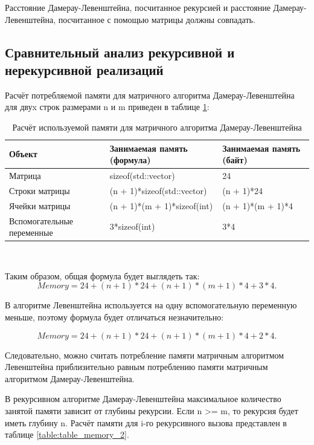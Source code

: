 \documentclass[a4paper,12pt]{article}
\begin{document}
    Расстояние Дамерау-Левенштейна, посчитанное рекурсией и расстояние Дамерау-Левенштейна, посчитанное с помощью матрицы должны совпадать.

	\subsection{Сравнительный анализ рекурсивной и нерекурсивной реализаций}
	
	Расчёт потребляемой памяти для матричного алгоритма Дамерау-Левенштейна для двуx строк размерами n и m приведен в таблице \ref{table:table_memory_1}:
	\begin{table} [h!]
	\begin{center}
	\caption{Расчёт используемой памяти для матричного алгоритма Дамерау-Левенштейна}
	\begin{tabular}{|p{4cm}|p{6cm}|p{5cm}|}
	\hline 
	Объект & Занимаемая память (формула)  & Занимаемая память (байт) \\ 
	\hline 
	Матрица & sizeof(std::vector) & 24 \\ 
	\hline 
	Строки матрицы & (n + 1)*sizeof(std::vector) & (n + 1)*24 \\ 
	\hline 
	Ячейки матрицы & (n + 1)*(m + 1)*sizeof(int) & (n + 1)*(m + 1)*4 \\ 
	\hline 
	Вспомогательные переменные  & 3*sizeof(int) & 3*4 \\ 
	\hline 
	\end{tabular} \\
    \label{table:table_memory_1}
    \end{center}
	\end{table}
	
	
	Таким образом, общая формула будет выглядеть так:
	\begin{equation}
	Memory = 24 + (n + 1)*24 + (n + 1)*(m + 1)*4 + 3*4.
	\label{eq:mem_1}
	\end{equation}
	
	
	В алгоритме Левенштейна используется на одну вспомогательную переменную меньше, поэтому формула будет отличаться незначительно:
	
	\[Memory = 24 + (n + 1)*24 + (n + 1)*(m + 1)*4 + 2*4.\]
	
	Следовательно, можно считать потребление памяти матричным алгоритмом Левенштейна приблизительно равным потреблению памяти матричным алгоритмом Дамерау-Левенштейна.
	
	В рекурсивном алгоритме Дамерау-Левенштейна максимальное количество занятой памяти зависит от глубины рекурсии. Если n >= m, то рекурсия будет иметь глубину n. Расчёт памяти для i-го рекурсивного вызова представлен в таблице \ref{table:table_memory_2}.
	
\end{document}
